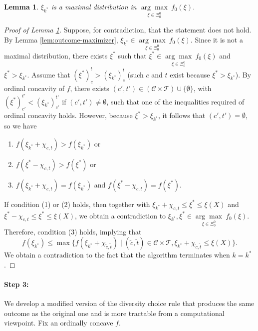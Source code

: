 \documentclass[12pt]{amsart}
\newtheorem{lemma}{Lemma}
\theoremstyle{remark}
\begin{document}
\begin{lemma}\label{lem:outcome-maximal}
$\xi_{k^*}$ is a maximal distribution in $\underset {\xi\in \Xi^0_0} {\arg\max} \: f_0(\xi)$.
\end{lemma}
\begin{proof}[Proof of Lemma \ref{lem:outcome-maximal}]\renewcommand{\qedsymbol}{$\blacksquare$}
Suppose, for contradiction, that the statement does not hold. By Lemma \ref{lem:outcome-maximizer}, $\xi_{k^*}\in \underset {\xi\in \Xi^0_0} {\arg\max} \: f_0(\xi)$.
Since it is not a maximal distribution, there exists $\xi^*$ such that $\xi^* \in \underset {\xi\in \Xi^0_0} {\arg\max} \: f_0(\xi)$ and $\xi^*>\xi_{k^*}$.
Assume that  $(\xi^*)^t_c >(\xi_{k^*})^t_c$ (such $c$ and $t$ exist because $\xi^*>\xi_{k^*}$).
By ordinal concavity of $f$, there exists $(c',t') \in (\mathcal C \times \mathcal T) \cup \{\emptyset\}$, with $(\xi^*)^{t'}_{c'} <(\xi_{k^*})^{t'}_{c'}$ if $(c',t') \neq \emptyset$, such that one of the inequalities required of  ordinal concavity holds.
However, because $\xi^* > \xi_{k^*}$, it follows that $(c',t')=\emptyset$, so we have
\begin{enumerate}
\item $f(\xi_{k^*}+\chi_{c,t})>f(\xi_{k^*})$ or
\item $f(\xi^*-\chi_{c,t})>f(\xi^*)$ or
\item $f(\xi_{k^*}+\chi_{c,t})=f(\xi_{k^*})$ and $f(\xi^*-\chi_{c,t})=f(\xi^*)$.
\end{enumerate}
If condition (1) or (2) holds, then together with $\xi_{k^*}+\chi_{c,t}\leq \xi^*\leq \xi(X)$ and $\xi^*-\chi_{c,t}\leq \xi^*\leq \xi(X)$, we obtain a contradiction to $\xi_{k^*}, \xi^* \in \underset {\xi\in \Xi^0_0} {\arg\max} \: f_0(\xi)$. Therefore, condition (3) holds, implying that
$$
f(\xi_{k^*}) \leq \max\{f(\xi_{k^*}+\chi_{\tilde c, \tilde t})\mid (\tilde c, \tilde t) \in \mathcal C \times \mathcal T, \xi_{k^*}+\chi_{\tilde c, \tilde t}\leq \xi(X)\}.
$$
We obtain a contradiction to the fact that the algorithm terminates when $k=k^*$.
\end{proof}

\paragraph{Step 3: } We develop a modified version of the diversity choice rule that produces the same outcome as the original one and is more tractable from a computational viewpoint.
Fix an ordinally concave $f$.

\medskip
\end{document}
